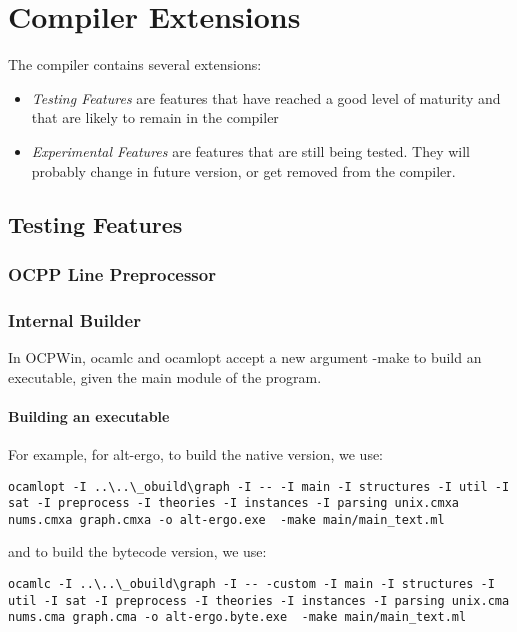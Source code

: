 
\chapter{Compiler Extensions}

The compiler contains several extensions:
\begin{itemize}
\item \emph{Testing Features} are features that have reached a good
  level of maturity and that are likely to remain in the compiler
\item \emph{Experimental Features} are features that are still being
  tested. They will probably change in future version, or get removed
  from the compiler.
\end{itemize}

\section{Testing Features}

\subsection{OCPP Line Preprocessor}

\subsection{Internal Builder}

In OCPWin, ocamlc and ocamlopt accept a new argument -make to build an executable, given the main module of the program.

\subsubsection{Building an executable}

For example, for alt-ergo, to build the native version, we use:

\begin{lstlisting}[style=Bash]
ocamlopt -I ..\..\_obuild\graph -I -- -I main -I structures -I util -I sat -I preprocess -I theories -I instances -I parsing unix.cmxa nums.cmxa graph.cmxa -o alt-ergo.exe  -make main/main_text.ml
\end{lstlisting}

and to build the bytecode version, we use:

\begin{lstlisting}[style=Bash]
ocamlc -I ..\..\_obuild\graph -I -- -custom -I main -I structures -I util -I sat -I preprocess -I theories -I instances -I parsing unix.cma nums.cma graph.cma -o alt-ergo.byte.exe  -make main/main_text.ml
\end{lstlisting}

